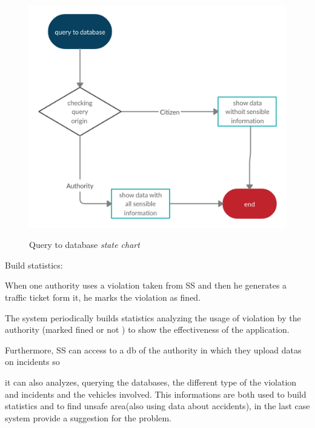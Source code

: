 \documentclass[../RASD.tex]{subfiles}
\begin{document}
    \begin{figure}[H]
        \centering
        \includegraphics[scale = 0.3]{assets/queryDbV1.png}\\[1.6 cm]
        \caption[ Query to database \textit{state diagram}]{ Query to database \textit{state chart}}
    \end{figure}


    Build statistics:

    When one authority uses a violation taken from SS and then he generates a traffic ticket form it, he marks the violation as fined.

    The system periodically builds statistics analyzing the usage of violation by the authority (marked fined or not ) to show the effectiveness of the application.

    Furthermore, SS can access to a db of the authority in which they upload datas on incidents so

    it can also analyzes, querying the databases, the different type of the violation and incidents and the vehicles involved. This informations are both used to build statistics and to find unsafe area(also using data about accidents), in the last case system provide a suggestion for the problem.
\end{document}
